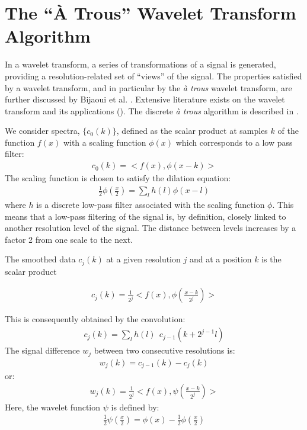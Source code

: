 \appendix
\chapter{The ``\`A Trous'' Wavelet Transform Algorithm}
 
In a wavelet transform, a series of transformations of a signal is 
generated, providing a resolution-related set of  ``views'' of the signal.  
The properties satisfied by a wavelet transform, and in particular by the
{\it \`a trous} wavelet transform, are further discussed by Bijaoui et al. \cite{starck:bij94_1}. 
Extensive literature exists on the wavelet transform
and its applications (\cite{wave:daube88,wave:chui92,wave:ruskai92,starck:book98}). 
The discrete {\it \`a trous} algorithm is described in \cite{wave:hol89,wave:shensa92}.

We consider spectra, 
$\{c_0(k)\}$, defined as  the scalar product at 
samples $k$ of the function $f(x)$ with a scaling function $\phi(x)$
which corresponds to a low pass filter:
\begin{eqnarray}
c_0(k) = < f(x), \phi(x-k)>
\end{eqnarray}
The scaling function is chosen to satisfy the dilation equation:
\begin{eqnarray}
\frac{1}{2}\phi(\frac{x}{2}) = \sum_l h(l)\phi(x-l)
\end{eqnarray}
where $h$ is a discrete low-pass filter associated with the scaling function
$\phi$.  This means that a low-pass filtering
of the signal is, by definition, closely linked to another resolution level
of the signal.  The distance between levels increases by a factor 2 from one
scale to the next.


The smoothed data $c_j(k)$ at a given resolution $j$ and at a position
$k$  is the scalar product 

\begin{eqnarray}
c_j(k)= \frac{1}{2^j}< f(x), \phi(\frac{x-k}{2^j})>
\end{eqnarray}

This is consequently obtained by the convolution:
\begin{eqnarray}
c_j(k) = \sum_l h(l) \ \ c_{j-1} (k+2^{j-1}l)
\end{eqnarray}
The signal difference $w_j$ between two consecutive resolutions is:
\begin{eqnarray}
w_j(k) = c_{j-1}(k) - c_j(k) 
\end{eqnarray}
or:
\begin{eqnarray}
w_j(k) = \frac{1}{2^j}< f(x), \psi(\frac{x-k}{2^j})>  
\label{wj}
\end{eqnarray}
Here, the wavelet function $\psi$ is defined by:
\begin{eqnarray}
\frac{1}{2}\psi(\frac{x}{2})  = \phi(x) - \frac{1}{2}\phi(\frac{x}{2})
\end{eqnarray}

